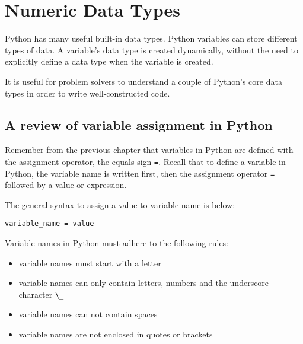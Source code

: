 \documentclass{book}
\providecommand{\tightlist}{%
      \setlength{\itemsep}{0pt}\setlength{\parskip}{0pt}}
\newcommand{\passthrough}[1]{#1}
\begin{document}
    




    
        \hypertarget{numeric-data-types}{%
\section{Numeric Data Types}\label{numeric-data-types}}
    




    
        Python has many useful built-in data types. Python variables can store
different types of data. A variable's data type is created dynamically,
without the need to explicitly define a data type when the variable is
created.

It is useful for problem solvers to understand a couple of Python's core
data types in order to write well-constructed code.

\hypertarget{a-review-of-variable-assignment-in-python}{%
\subsection{A review of variable assignment in
Python}\label{a-review-of-variable-assignment-in-python}}

Remember from the previous chapter that variables in Python are defined
with the assignment operator, the equals sign
\passthrough{\lstinline!=!}. Recall that to define a variable in Python,
the variable name is written first, then the assignment operator
\passthrough{\lstinline!=!} followed by a value or expression.

The general syntax to assign a value to variable name is below:

\begin{lstlisting}
variable_name = value
\end{lstlisting}

Variable names in Python must adhere to the following rules:

\begin{itemize}
\tightlist
\item
  variable names must start with a letter
\item
  variable names can only contain letters, numbers and the underscore
  character \passthrough{\lstinline!\_!}
\item
  variable names can not contain spaces
\item
  variable names are not enclosed in quotes or brackets
\end{itemize}
\end{document}
